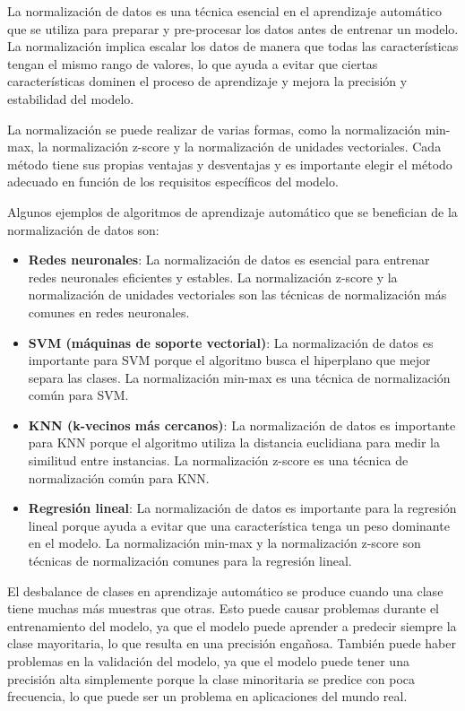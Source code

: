 La normalización de datos es una técnica esencial en el aprendizaje automático que se utiliza para preparar y pre-procesar los datos antes de entrenar un modelo. La normalización implica escalar los datos de manera que todas las características tengan el mismo rango de valores, lo que ayuda a evitar que ciertas características dominen el proceso de aprendizaje y mejora la precisión y estabilidad del modelo.

La normalización se puede realizar de varias formas, como la normalización min-max, la normalización z-score y la normalización de unidades vectoriales. Cada método tiene sus propias ventajas y desventajas y es importante elegir el método adecuado en función de los requisitos específicos del modelo.

Algunos ejemplos de algoritmos de aprendizaje automático que se benefician de la normalización de datos son:

\begin{itemize}
	\item \textbf{Redes neuronales}: La normalización de datos es esencial para entrenar redes neuronales eficientes y estables. La normalización z-score y la normalización de unidades vectoriales son las técnicas de normalización más comunes en redes neuronales.

	\item \textbf{SVM (máquinas de soporte vectorial)}: La normalización de datos es importante para SVM porque el algoritmo busca el hiperplano que mejor separa las clases. La normalización min-max es una técnica de normalización común para SVM.

	\item \textbf{KNN (k-vecinos más cercanos)}: La normalización de datos es importante para KNN porque el algoritmo utiliza la distancia euclidiana para medir la similitud entre instancias. La normalización z-score es una técnica de normalización común para KNN.

	\item \textbf{Regresión lineal}: La normalización de datos es importante para la regresión lineal porque ayuda a evitar que una característica tenga un peso dominante en el modelo. La normalización min-max y la normalización z-score son técnicas de normalización comunes para la regresión lineal.
\end{itemize}

El desbalance de clases en aprendizaje automático se produce cuando una clase tiene muchas más muestras que otras. Esto puede causar problemas durante el entrenamiento del modelo, ya que el modelo puede aprender a predecir siempre la clase mayoritaria, lo que resulta en una precisión engañosa. También puede haber problemas en la validación del modelo, ya que el modelo puede tener una precisión alta simplemente porque la clase minoritaria se predice con poca frecuencia, lo que puede ser un problema en aplicaciones del mundo real.

